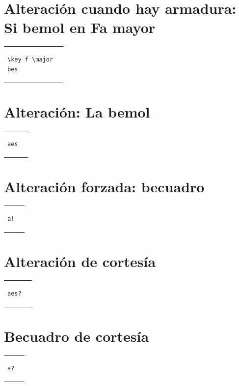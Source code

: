 \documentclass[a4paper,10pt,oneside,headinclude,titlepage]{article} %
\begin{document}
\section*{Alteración cuando hay armadura: Si bemol en Fa mayor}
\begin{tabular}{m{2cm}m{2cm}}
\begin{verbatim}
\key f \major
bes
\end{verbatim}
&
\begin[fragment,relative=2,notime]{lilypond}
    \key f \major
    bes
\end{lilypond}
\end{tabular}

\section*{Alteración: La bemol}
\begin{tabular}{m{2cm}m{2cm}}
\begin{verbatim}
aes
\end{verbatim}
&
\begin[fragment,relative=2,notime]{lilypond}
aes
\end{lilypond}
\end{tabular}

\section*{Alteración forzada: becuadro}
\begin{tabular}{m{2cm}m{2cm}}
\begin{verbatim}
a!
\end{verbatim}
&
\begin[fragment,relative=2,notime]{lilypond}
a!
\end{lilypond}
\end{tabular}

\section*{Alteración de cortesía}
\begin{tabular}{m{2cm}m{2cm}}
\begin{verbatim}
aes?
\end{verbatim}
&
\begin[fragment,relative=2,notime]{lilypond}
aes?
\end{lilypond}
\end{tabular}

\section*{Becuadro de cortesía}
\begin{tabular}{m{2cm}m{2cm}}
\begin{verbatim}
a?
\end{verbatim}
&
\begin[fragment,relative=2,notime]{lilypond}
a?
\end{lilypond}
\end{tabular}
\end{document}
